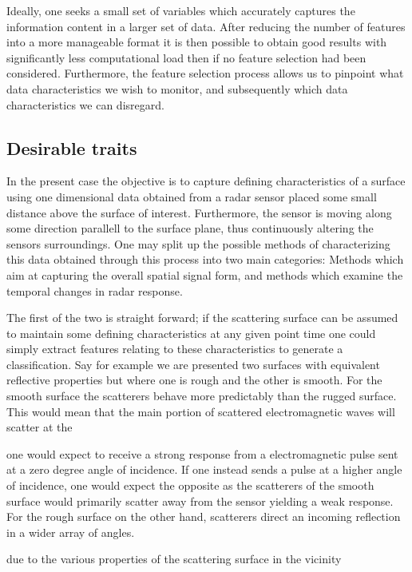 \documentclass[a4paper, 12pt]{article}
\begin{document}
Ideally, one seeks a small set of variables which accurately captures the information content in a larger set of data. After reducing the number of features into a more manageable format it is then possible to obtain good results with significantly less computational load then if no feature selection had been considered. Furthermore, the feature selection process allows us to pinpoint what data characteristics we wish to monitor, and subsequently which data characteristics we can disregard. 

\subsection{Desirable traits}

In the present case the objective is to capture defining characteristics of a surface using one dimensional data obtained from a radar sensor placed some small distance above the surface of interest. Furthermore, the sensor is moving along some direction parallell to the surface plane, thus continuously altering the sensors surroundings. One may split up the possible methods of characterizing this data obtained through this process into two main categories: Methods which aim at capturing the overall spatial signal form, and methods which examine the temporal changes in radar response. 

The first of the two is straight forward; if the scattering surface can be assumed to maintain some defining characteristics at any given point time one could simply extract features relating to these characteristics to generate a classification. Say for example we are presented two surfaces with equivalent reflective properties but where one is rough and the other is smooth. For the smooth surface the scatterers behave more predictably than the rugged surface. This would mean that the main portion of scattered electromagnetic waves will scatter at the

one would expect to receive a strong response from a electromagnetic pulse sent at a zero degree angle of incidence. If one instead sends a pulse at a higher angle of incidence, one would expect the opposite as the scatterers of the smooth surface would primarily scatter away from the sensor yielding a weak response. For the rough surface on the other hand, scatterers direct an incoming reflection in a wider array of angles. 



due to the various properties of the scattering surface in the vicinity 
\end{document}
